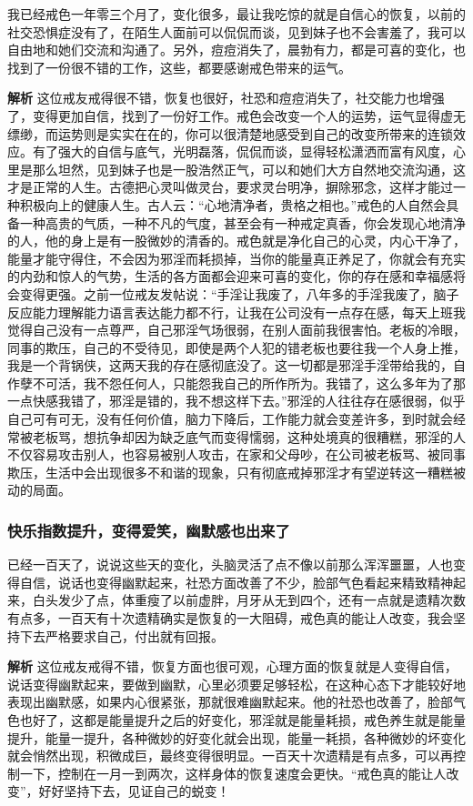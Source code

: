 \begin{case}
    我已经戒色一年零三个月了，变化很多，最让我吃惊的就是自信心的恢复，以前的社交恐惧症没有了，在陌生人面前可以侃侃而谈，见到妹子也不会害羞了，我可以自由地和她们交流和沟通了。另外，痘痘消失了，晨勃有力，都是可喜的变化，也找到了一份很不错的工作，这些，都要感谢戒色带来的运气。

    \textbf{解析} 这位戒友戒得很不错，恢复也很好，社恐和痘痘消失了，社交能力也增强了，变得更加自信，找到了一份好工作。戒色会改变一个人的运势，运气显得虚无缥缈，而运势则是实实在在的，你可以很清楚地感受到自己的改变所带来的连锁效应。有了强大的自信与底气，光明磊落，侃侃而谈，显得轻松潇洒而富有风度，心里是那么坦然，见到妹子也是一股浩然正气，可以和她们大方自然地交流沟通，这才是正常的人生。古德把心灵叫做灵台，要求灵台明净，摒除邪念，这样才能过一种积极向上的健康人生。古人云：“心地清净者，贵格之相也。”戒色的人自然会具备一种高贵的气质，一种不凡的气度，甚至会有一种戒定真香，你会发现心地清净的人，他的身上是有一股微妙的清香的。戒色就是净化自己的心灵，内心干净了，能量才能守得住，不会因为邪淫而耗损掉，当你的能量真正养足了，你就会有充实的内劲和惊人的气势，生活的各方面都会迎来可喜的变化，你的存在感和幸福感将会变得更强。之前一位戒友发帖说：“手淫让我废了，八年多的手淫我废了，脑子反应能力理解能力语言表达能力都不行，让我在公司没有一点存在感，每天上班我觉得自己没有一点尊严，自己邪淫气场很弱，在别人面前我很害怕。老板的冷眼，同事的欺压，自己的不受待见，即使是两个人犯的错老板也要往我一个人身上推，我是一个背锅侠，这两天我的存在感彻底没了。这一切都是邪淫手淫带给我的，自作孽不可活，我不怨任何人，只能怨我自己的所作所为。我错了，这么多年为了那一点快感我错了，邪淫是错的，我不想这样下去。”邪淫的人往往存在感很弱，似乎自己可有可无，没有任何价值，脑力下降后，工作能力就会变差许多，到时就会经常被老板骂，想抗争却因为缺乏底气而变得懦弱，这种处境真的很糟糕，邪淫的人不仅容易攻击别人，也容易被别人攻击，在家和父母吵，在公司被老板骂、被同事欺压，生活中会出现很多不和谐的现象，只有彻底戒掉邪淫才有望逆转这一糟糕被动的局面。
\end{case}

\subsubsection{快乐指数提升，变得爱笑，幽默感也出来了}

\begin{case}
    已经一百天了，说说这些天的变化，头脑灵活了点不像以前那么浑浑噩噩，人也变得自信，说话也变得幽默起来，社恐方面改善了不少，脸部气色看起来精致精神起来，白头发少了点，体重瘦了以前虚胖，月牙从无到四个，还有一点就是遗精次数有点多，一百天有十次遗精确实是恢复的一大阻碍，戒色真的能让人改变，我会坚持下去严格要求自己，付出就有回报。

    \textbf{解析} 这位戒友戒得不错，恢复方面也很可观，心理方面的恢复就是人变得自信，说话变得幽默起来，要做到幽默，心里必须要足够轻松，在这种心态下才能较好地表现出幽默感，如果内心很紧张，那就很难幽默起来。他的社恐也改善了，脸部气色也好了，这都是能量提升之后的好变化，邪淫就是能量耗损，戒色养生就是能量提升，能量一提升，各种微妙的好变化就会出现，能量一耗损，各种微妙的坏变化就会悄然出现，积微成巨，最终变得很明显。一百天十次遗精是有点多，可以再控制一下，控制在一月一到两次，这样身体的恢复速度会更快。“戒色真的能让人改变”，好好坚持下去，见证自己的蜕变！
\end{case}

